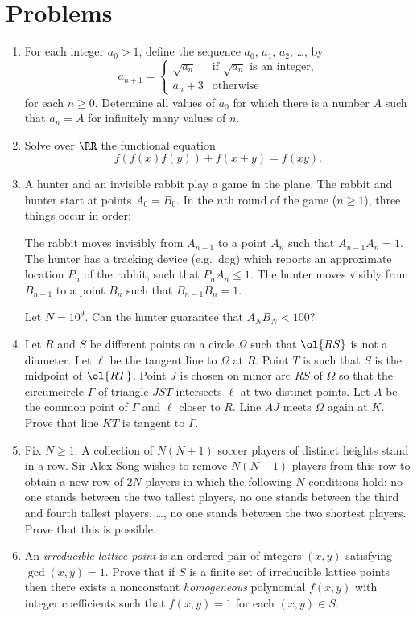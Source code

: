 \documentclass[11pt]{scrartcl}
\begin{document}
\section{Problems}
\begin{enumerate}[\bfseries 1.]
\item %
For each integer $a_0 > 1$, define the sequence $a_0$, $a_1$, $a_2$,
\dots, by
\[
  a_{n+1} =
  \begin{cases}
    \sqrt{a_n} & \text{if $\sqrt{a_n}$ is an integer,} \\
    a_n + 3 & \text{otherwise}
  \end{cases}
\]
for each $n \ge 0$.
Determine all values of $a_0$ for which there is a number $A$
such that $a_n = A$ for infinitely many values of $n$.

\item %
Solve over $\RR$ the functional equation
\[ f\left( f(x)f(y) \right) + f(x+y) = f(xy). \]

\item %
A hunter and an invisible rabbit play a game in the plane.
The rabbit and hunter start at points $A_0 = B_0$.
In the $n$th round of the game ($n \ge 1$), three things occur in order:
\begin{enumerate}[(i)]
  \ii The rabbit moves invisibly from $A_{n-1}$ to a point $A_n$
  such that $A_{n-1} A_n = 1$.
  \ii The hunter has a tracking device (e.g.\ dog)
  which reports an approximate location $P_n$ of the rabbit,
  such that $P_n A_n \le 1$.
  \ii The hunter moves visibly from $B_{n-1}$ to a point $B_n$
  such that $B_{n-1} B_n = 1$.
\end{enumerate}
Let $N = 10^9$. Can the hunter guarantee that $A_N B_N < 100$?

\item %
Let $R$ and $S$ be different points on a circle $\Omega$
such that $\ol{RS}$ is not a diameter.
Let $\ell$ be the tangent line to $\Omega$ at $R$.
Point $T$ is such that $S$ is the midpoint of $\ol{RT}$.
Point $J$ is chosen on minor arc $RS$ of $\Omega$ so that
the circumcircle $\Gamma$ of triangle $JST$ intersects $\ell$
at two distinct points.
Let $A$ be the common point of $\Gamma$ and $\ell$ closer to $R$.
Line $AJ$ meets $\Omega$ again at $K$.
Prove that line $KT$ is tangent to $\Gamma$.

\item %
Fix $N \ge 1$. A collection of $N(N+1)$ soccer players of distinct
heights stand in a row.
Sir Alex Song wishes to remove $N(N-1)$ players from this row
to obtain a new row of $2N$ players in which the following $N$
conditions hold: no one stands between the two tallest players,
no one stands between the third and fourth tallest players, \dots,
no one stands between the two shortest players.
Prove that this is possible.

\item %
An \emph{irreducible lattice point} is an ordered pair
of integers $(x,y)$ satisfying $\gcd(x,y) = 1$.
Prove that if $S$ is a finite set of irreducible lattice points
then there exists a nonconstant
\emph{homogeneous} polynomial $f(x,y)$ with integer coefficients
such that $f(x,y)=1$ for each $(x,y) \in S$.

\end{enumerate}
\end{document}
